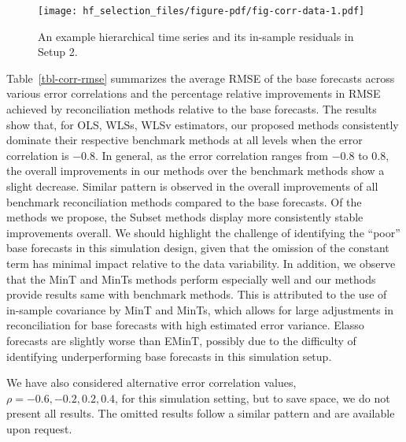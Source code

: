 \documentclass[11pt,a4paper,]{article}
\begin{document}
\begin{figure}

{\centering \texttt{[image: hf\_selection\_files/figure-pdf/fig-corr-data-1.pdf]}

}

\caption{\label{fig-corr-data}An example hierarchical time series and
its in-sample residuals in Setup 2.}

\end{figure}

Table~\ref{tbl-corr-rmse} summarizes the average RMSE of the base
forecasts across various error correlations and the percentage relative
improvements in RMSE achieved by reconciliation methods relative to the
base forecasts. The results show that, for OLS, WLSs, WLSv estimators,
our proposed methods consistently dominate their respective benchmark
methods at all levels when the error correlation is \(-0.8\). In
general, as the error correlation ranges from \(-0.8\) to \(0.8\), the
overall improvements in our methods over the benchmark methods show a
slight decrease. Similar pattern is observed in the overall improvements
of all benchmark reconciliation methods compared to the base forecasts.
Of the methods we propose, the Subset methods display more consistently
stable improvements overall. We should highlight the challenge of
identifying the ``poor'' base forecasts in this simulation design, given
that the omission of the constant term has minimal impact relative to
the data variability. In addition, we observe that the MinT and MinTs
methods perform especially well and our methods provide results same
with benchmark methods. This is attributed to the use of in-sample
covariance by MinT and MinTs, which allows for large adjustments in
reconciliation for base forecasts with high estimated error variance.
Elasso forecasts are slightly worse than EMinT, possibly due to the
difficulty of identifying underperforming base forecasts in this
simulation setup.

We have also considered alternative error correlation values,
\(\rho = -0.6, -0.2, 0.2, 0.4\), for this simulation setting, but to
save space, we do not present all results. The omitted results follow a
similar pattern and are available upon request.
\end{document}
